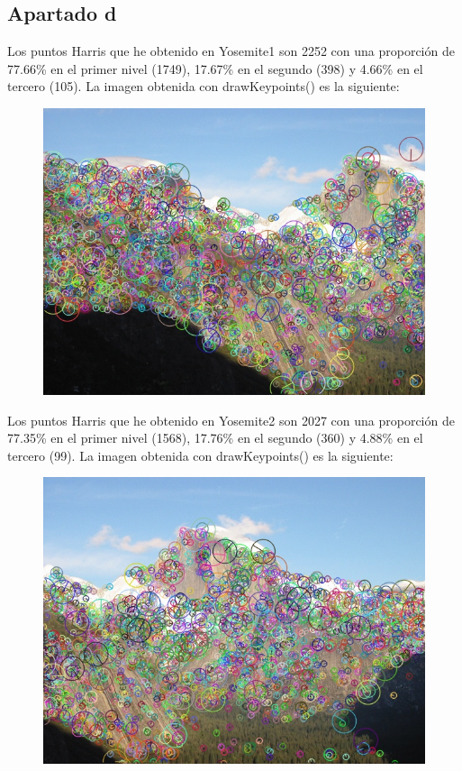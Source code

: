 \documentclass[10pt,a4paper]{article}
\begin{document}
\subsection{Apartado d}

Los puntos Harris que he obtenido en Yosemite1 son 2252 con una proporción de 77.66\% en el primer nivel (1749), 17.67\% en el segundo (398) y 4.66\% en el tercero (105). La imagen obtenida con drawKeypoints() es la siguiente:

\begin{figure}[h]
	\includegraphics[width=\textwidth]{yosemite1_kpts}
\end{figure}


Los puntos Harris que he obtenido en Yosemite2 son 2027 con una proporción de 77.35\% en el primer nivel (1568), 17.76\% en el segundo (360) y 4.88\% en el tercero (99). La imagen obtenida con drawKeypoints() es la siguiente:

\begin{figure}[h]
	\includegraphics[width=\textwidth]{yosemite2_kpts}
\end{figure}
\end{document}

